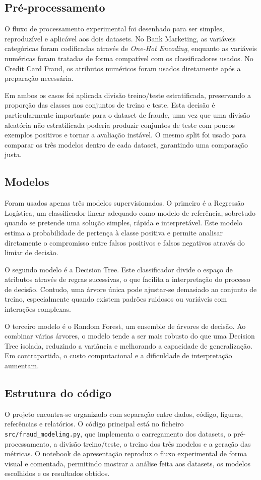 \documentclass[10pt,twocolumn]{article}
\begin{document}
\subsection{Pré-processamento}
O fluxo de processamento experimental foi desenhado para ser simples, reproduzível e aplicável aos dois datasets. No Bank Marketing, as variáveis categóricas foram codificadas através de \textit{One-Hot Encoding}, enquanto as variáveis numéricas foram tratadas de forma compatível com os classificadores usados. No Credit Card Fraud, os atributos numéricos foram usados diretamente após a preparação necessária.

Em ambos os casos foi aplicada divisão treino/teste estratificada, preservando a proporção das classes nos conjuntos de treino e teste. Esta decisão é particularmente importante para o dataset de fraude, uma vez que uma divisão aleatória não estratificada poderia produzir conjuntos de teste com poucos exemplos positivos e tornar a avaliação instável. O mesmo split foi usado para comparar os três modelos dentro de cada dataset, garantindo uma comparação justa.

\subsection{Modelos}
Foram usados apenas três modelos supervisionados. O primeiro é a Regressão Logística, um classificador linear adequado como modelo de referência, sobretudo quando se pretende uma solução simples, rápida e interpretável. Este modelo estima a probabilidade de pertença à classe positiva e permite analisar diretamente o compromisso entre falsos positivos e falsos negativos através do limiar de decisão.

O segundo modelo é a Decision Tree. Este classificador divide o espaço de atributos através de regras sucessivas, o que facilita a interpretação do processo de decisão. Contudo, uma árvore única pode ajustar-se demasiado ao conjunto de treino, especialmente quando existem padrões ruidosos ou variáveis com interações complexas.

O terceiro modelo é o Random Forest, um ensemble de árvores de decisão. Ao combinar várias árvores, o modelo tende a ser mais robusto do que uma Decision Tree isolada, reduzindo a variância e melhorando a capacidade de generalização. Em contrapartida, o custo computacional e a dificuldade de interpretação aumentam.

\subsection{Estrutura do código}
O projeto encontra-se organizado com separação entre dados, código, figuras, referências e relatórios. O código principal está no ficheiro \texttt{src/fraud\_modeling.py}, que implementa o carregamento dos datasets, o pré-processamento, a divisão treino/teste, o treino dos três modelos e a geração das métricas. O notebook de apresentação reproduz o fluxo experimental de forma visual e comentada, permitindo mostrar a análise feita aos datasets, os modelos escolhidos e os resultados obtidos.
\end{document}
